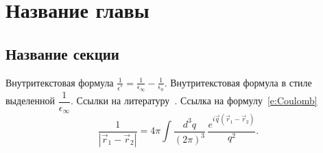 \chapter{Название главы}
\section{Название секции}

Внутритекстовая формула $\frac{1}{\epsilon^*}=\frac{1}{\epsilon_\infty}-\frac{1}{\epsilon_0}$.
Внутритекстовая формула в стиле выделенной $\dfrac{1}{\epsilon_\infty}$.
Ссылки на литературу~\cite{Yoffe_1993_AP_42_173,Efros_1982_FTP_16_7_1209,%
Anselm_1978,Segall_1968,Agranovich_1983,InP,Mishchenko_1996,Skvortsov_2008,%
Perelman_2003_math:0307245,Nielsen_2010_1006.2735,patent1,patent2}.
Ссылка на формулу~\eqref{e:Coulomb}
\begin{equation}\label{e:Coulomb}
  \frac{1}{|\vec r_1 - \vec r_2|} =
  4\pi \int \frac{d^3 q}{(2\pi)^3}\,
  \frac{e^{i\vec q(\vec r_1 - \vec r_2)}}{q^2}.
\end{equation}

